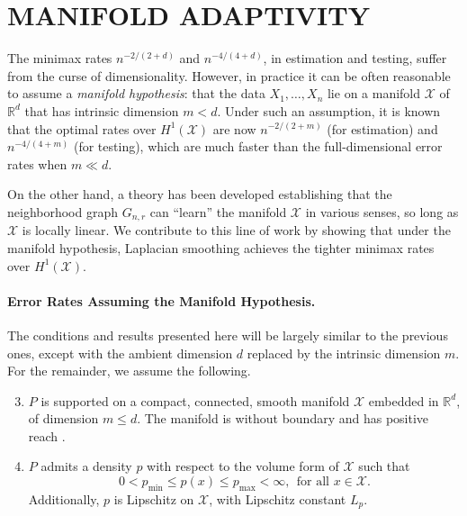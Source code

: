 \documentclass[twoside]{article}
\newcommand{\Reals}{\mathbb{R}}
\newcommand{\1}{\mathbf{1}}
\newcommand{\Rd}{\Reals^d}
\newcommand{\Xset}{\mathcal{X}}
\theoremstyle{definition}
\theoremstyle{remark}
\begin{document}
\section{MANIFOLD ADAPTIVITY}
\label{sec:manifold_adaptivity}

The minimax rates $n^{-2/(2 + d)}$ and $n^{-4/(4 + d)}$, in estimation and testing, suffer from the curse of dimensionality. However, in practice it can be often reasonable to assume a \emph{manifold hypothesis}: that the data $X_1,\ldots,X_n$ lie on a manifold $\Xset$ of $\Rd$ that has intrinsic dimension $m < d$. Under such an assumption, it is known \citep{bickel2007,ariascastro2018} that the optimal rates over $H^1(\Xset)$ are now $n^{-2/(2 + m)}$ (for estimation) and $n^{-4/(4 + m)}$ (for testing), which are much faster than the full-dimensional error rates when $m \ll d$. 



On the other hand, a theory has been developed \citep{niyogi2008finding,belkin03,belkin05,niyogi2013,balakrishnan2012minimax,balakrishnan2013cluster} establishing that the neighborhood graph $G_{n,r}$ can ``learn'' the manifold $\Xset$ in various senses, so long as $\Xset$ is locally linear. We contribute to this line of work by showing that under the manifold hypothesis, Laplacian smoothing achieves the tighter minimax rates over $H^1(\Xset)$.

\paragraph{Error Rates Assuming the Manifold Hypothesis.}

The conditions and results presented here will be largely similar to the previous ones, except with the ambient dimension $d$ replaced by the intrinsic dimension $m$. For the remainder, we assume the following.
\begin{enumerate}[label=(P\arabic*)]
	\setcounter{enumi}{2}
	\item 
	\label{asmp:domain_manifold}
	$P$ is supported on a compact, connected, smooth manifold $\Xset$ embedded in $\Rd$, of dimension $m \leq d$. The manifold is without boundary and has positive reach \citep{federer1959}.
	\item 
	\label{asmp:density_manifold} 
	$P$ admits a density $p$ with respect to the volume form of $\Xset$ such that 
	\begin{equation*}
	0 < p_{\min} \leq p(x) \leq p_{\max} < \infty, ~~\textrm{for all $x \in \Xset$}. 
	\end{equation*}
	Additionally, $p$ is Lipschitz on $\Xset$, with Lipschitz constant $L_p$.
\end{enumerate}
\end{document}
